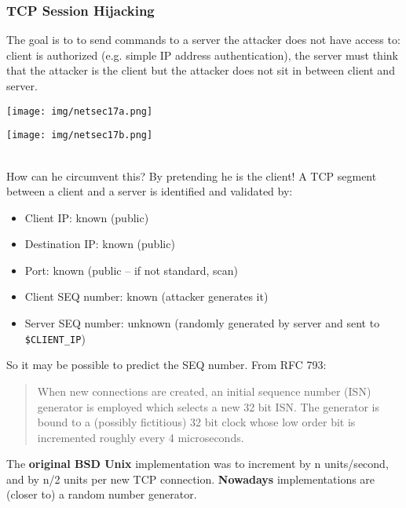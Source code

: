 \documentclass[a4paper, 10pt, titlepage]{article}
\begin{document}
\subsubsection{TCP Session Hijacking}
The goal is to to send commands to a server the attacker does not have access to: client is authorized (e.g. simple IP address authentication), the server must think that the attacker is the client but the attacker does not sit in between client and server. \medskip\\

\begin{minipage}{0.55\textwidth}
	\begin{center}
		\texttt{[image: img/netsec17a.png]}
	\end{center}
\end{minipage}
\hfill
\begin{minipage}{0.35\textwidth}
	\begin{center}
		\texttt{[image: img/netsec17b.png]}
	\end{center}
\end{minipage} \medskip\\
How can he circumvent this? By pretending he is the client! A TCP segment between a client and a server is identified and validated by:
\begin{itemize}
	\item Client IP: known (public)
	\item Destination IP: known (public)
	\item Port: known (public – if not standard, scan)
	\item Client SEQ number: known (attacker generates it)
	\item Server SEQ number: unknown (randomly generated by server and sent to \lstinline|$CLIENT_IP|)
\end{itemize}
So it may be possible to predict the SEQ number. From RFC 793:
\begin{quote}
	When new connections are created, an initial sequence 	number (ISN) generator is employed which selects a new 32 	bit ISN. The generator is bound to a (possibly fictitious) 32 bit clock whose low order bit is incremented roughly every 4 microseconds.
\end{quote}
The \textbf{original BSD Unix} implementation was to increment by n units/second, and by n/2 units per new TCP connection. \textbf{Nowadays} implementations are (closer to) a random number generator.
\end{document}
